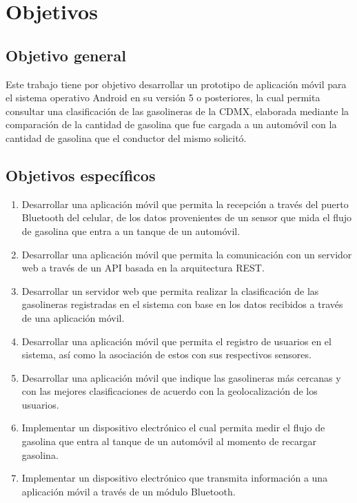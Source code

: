 
\section{Objetivos}

\subsection{Objetivo general}
Este trabajo tiene por objetivo desarrollar un prototipo de aplicación móvil para el sistema operativo Android en su versión 5 o posteriores, la cual permita consultar una clasificación de las gasolineras de la CDMX, elaborada mediante la comparación de la cantidad de gasolina que fue cargada a un automóvil con la cantidad de gasolina que el conductor del mismo solicitó.
\subsection{Objetivos específicos}
\begin{enumerate}[label=\arabic*.]
    \item Desarrollar una aplicación móvil que permita la recepción a través del puerto Bluetooth del celular, de los datos provenientes de un sensor que mida el flujo de gasolina que entra a un tanque de un automóvil.
	\item Desarrollar una aplicación móvil que permita la comunicación con un servidor web a través de un API basada en la arquitectura REST.
	\item Desarrollar un servidor web que permita realizar la clasificación de las gasolineras registradas en el sistema con base en los datos recibidos a través de una aplicación móvil.
	\item Desarrollar una aplicación móvil que permita el registro de usuarios en el sistema, así como la asociación de estos con sus respectivos sensores.
	\item Desarrollar una aplicación móvil que indique las gasolineras más cercanas y con las mejores clasificaciones de acuerdo con la geolocalización de los usuarios.
	\item Implementar un dispositivo electrónico el cual permita medir el flujo de gasolina que entra al tanque de un automóvil al momento de recargar gasolina.
	\item Implementar un dispositivo electrónico que transmita información a una aplicación móvil a través de un módulo Bluetooth.
\end{enumerate}